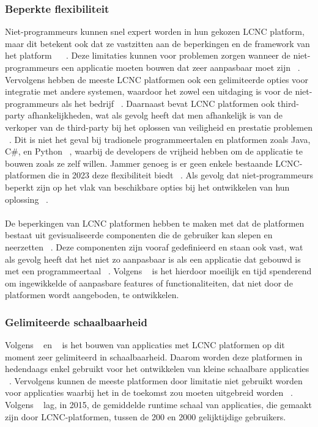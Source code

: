 \subsubsection{Beperkte flexibiliteit}
\label{subsec:beperkte-flexibiliteit}
Niet-programmeurs kunnen snel expert worden in hun gekozen LCNC platform, maar dit betekent ook dat ze vastzitten aan de beperkingen en de framework van het platform ~\autocite{Sufi_2023} ~\autocite{Talesra_2021}.
Deze limitaties kunnen voor problemen zorgen wanneer de niet-programmeurs een applicatie moeten bouwen dat zeer aanpasbaar moet zijn ~\autocite{Talesra_2021}. Vervolgens hebben de meeste LCNC platformen ook een gelimiteerde
opties voor integratie met andere systemen, waardoor het zowel een uitdaging is voor de niet-programmeurs als het bedrijf ~\autocite{Talesra_2021}. Daarnaast bevat LCNC platformen ook third-party afhankelijkheden, wat als gevolg heeft dat
men afhankelijk is van de verkoper van de third-party bij het oplossen van veiligheid en prestatie problemen ~\autocite{Talesra_2021}.
Dit is niet het geval bij tradionele programmeertalen en platformen zoals Java, C\#, en Python ~\autocite{Sufi_2023}, waarbij de developers de vrijheid hebben om de applicatie te bouwen zoals ze zelf willen.
Jammer genoeg is er geen enkele bestaande LCNC-platformen die in 2023 deze flexibiliteit biedt ~\autocite{Sufi_2023}. Als gevolg dat niet-programmeurs
beperkt zijn op het vlak van beschikbare opties bij het ontwikkelen van hun oplossing ~\autocite{Sufi_2023}.
\\
\\
De beperkingen van LCNC platformen hebben te maken met dat de platformen bestaat uit gevisualiseerde componenten die de gebruiker kan slepen en neerzetten ~\autocite{Yan2021}.
Deze componenten zijn vooraf gedefinieerd en staan ook vast, wat als gevolg heeft dat het niet zo aanpasbaar is als een applicatie dat gebouwd is met een programmeertaal ~\autocite{Yan2021}.
Volgens ~\textcite{Yan2021} is het hierdoor moeilijk en tijd spenderend om ingewikkelde of aanpasbare features of functionaliteiten, dat niet door de platformen wordt aangeboden, te ontwikkelen.
\subsubsection*{Gelimiteerde schaalbaarheid}
\label{subsec:gelimiteerde-schaalbaarheid}
Volgens ~\textcite{Elshan2023} en ~\textcite{Sufi_2023} is het bouwen van applicaties met LCNC platformen op dit moment zeer gelimiteerd in schaalbaarheid. Daarom worden deze platformen
in hedendaags enkel gebruikt voor het ontwikkelen van kleine schaalbare applicaties ~\autocite{Sufi_2023}. Vervolgens kunnen de meeste platformen door limitatie niet gebruikt worden voor applicaties waarbij het in 
de toekomst zou moeten uitgebreid worden ~\autocite{Elshan2023}. Volgens ~\textcite{Yan2021} lag, in 2015, de gemiddelde runtime schaal van applicaties, die gemaakt zijn door LCNC-platformen, tussen de 200 en 2000 gelijktijdige gebruikers.

